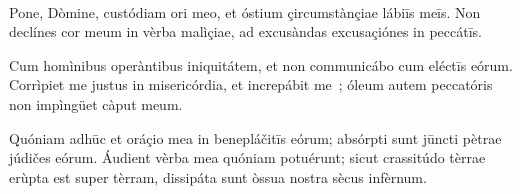 \newcommand{\enablePageBorder}{1}
\newcommand{\enablePageHeader}{0}
\newcommand{\pageBorderBegin}{0}





\setlength{\parindent}{0pt}



\pagestyle{empty}



\vfill

~~
\vfill








\vfill

\newpage


\prayerVersicleResponse
{Pone, Dòmine, custódiam ori meo, et óstium çircumstànçiae lábiīs meīs.}
{Non declínes cor meum in vèrba malìçiae, ad excusàndas excusaçiónes in peccátīs.}
\vfill

\prayerVersicleResponse
{Cum homìnibus operàntibus iniquitátem, et non communicábo cum eléctīs eórum.}
{Corrìpiet me justus in misericórdia, et increpábit me~; óleum autem peccatóris non impìngüet càput meum.}
\vfill

\prayerVersicleResponse
{Quóniam adhūc et oráçio mea in benepláčitīs eórum; absórpti sunt jūncti pètrae júdičes eórum.}
{Áudient vèrba mea quóniam potuérunt; sicut crassitúdo tèrrae erùpta est super tèrram,  dissipáta sunt òssua nostra sècus infèrnum.}
\vfill

